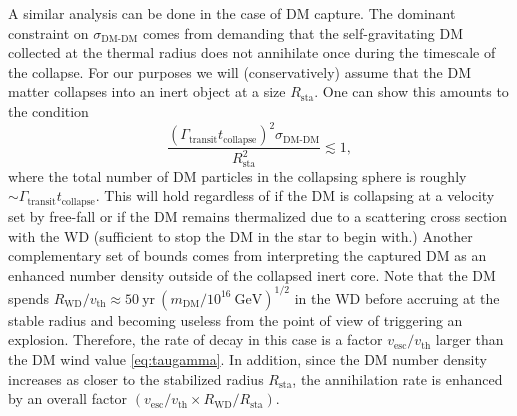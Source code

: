 \documentclass[twocolumn,preprintnumbers,amsmath,amssymb,prd, superscriptaddress]{revtex4} %
\newcommand{\GeV}{\text{GeV}}
\def\r{\right)}
\def\l{\left(}
\begin{document}
A similar analysis can be done in the case of DM capture.
The dominant constraint on $\sigma_\text{DM-DM}$ comes from demanding that the self-gravitating DM collected at the thermal radius does not annihilate once during the timescale of the collapse.
For our purposes we will (conservatively) assume that the DM matter collapses into an inert object at a size $R_\text{sta}$.
One can show this amounts to the condition
\begin{equation}
\frac{(\Gamma_\text{transit} t_\text{collapse})^2 \sigma_\text{DM-DM}}{R_\text{sta}^2} \lesssim 1,
\end{equation}
where the total number of DM particles in the collapsing sphere is roughly $\sim \Gamma_\text{transit} t_\text{collapse}$.
This will hold regardless of if the DM is collapsing at a velocity set by free-fall or if the DM remains thermalized due to a scattering cross section with the WD (sufficient to stop the DM in the star to begin with.)
Another complementary set of bounds comes from interpreting the captured DM as an enhanced number density outside of the collapsed inert core.
Note that the DM spends $R_\text{WD}/v_\text{th} \approx 50 ~\text{yr} ~(m_\text{DM}/10^{16} ~\GeV)^{1/2}$ in the WD before accruing at the stable radius and becoming useless from the point of view of triggering an explosion.
Therefore, the rate of decay in this case is a factor $v_\text{esc}/v_\text{th}$ larger than the DM wind value \eqref{eq:taugamma}.
In addition, since the DM number density increases as closer to the stabilized radius $R_\text{sta}$, the annihilation rate is enhanced by an overall factor $(v_\text{esc}/v_\text{th} \times R_\text{WD}/R_\text{sta})$.
\end{document}

